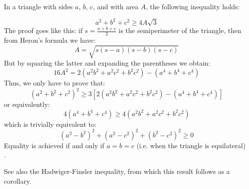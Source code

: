 \documentclass[12pt]{article}
\begin{document}
In a triangle with sides $a$, $b$, $c$, and with area $A$, the following inequality holds:

$$ a^2 + b^2 + c^2 \geq 4A \sqrt{3}$$
The proof goes like this: if $s=\frac{a+b+c}{2}$ is the semiperimeter of the
triangle, then from Heron's formula we have:
$$ A = \sqrt{s(s-a)(s-b)(s-c)} $$
But by squaring the latter and expanding the parentheses we obtain:
$$ 16A^2 = 2(a^2 b^2 + a^2 c^2 + b^2 c^2) - (a^4 + b^4 + c^4) $$
Thus, we only have to prove that:
$$ (a^2 + b^2 + c^2)^2 \geq 3[2(a^2 b^2 + a^2 c^2 + b^2 c^2) - (a^4 + b^4 +
c^4)] $$ or equivalently:
$$ 4(a^4 + b^4 + c^4) \geq 4(a^2 b^2 + a^2 c^2 + b^2 c^2)$$
which is trivially equivalent to:
$$ (a^2 - b^2)^2 + (a^2 - c^2)^2 + (b^2 - c^2)^2 \geq 0$$
Equality is achieved if and only if $a=b=c$ (i.e. when the triangle is equilateral) .

See also the Hadwiger-Finsler inequality, from which this result follows as a corollary.
\end{document}

